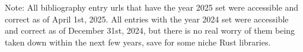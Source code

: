 \renewcommand*\chapterpagestyle{scrheadings}
\printbibliography[heading=bibintoc]

Note: All bibliography entry urls that have the year 2025 set were accessible and correct as of April 1st, 2025.
All entries with the year 2024 set were accessible and correct as of December 31st, 2024,
but there is no real worry of them being taken down within the next few years, save for some niche Rust libraries.